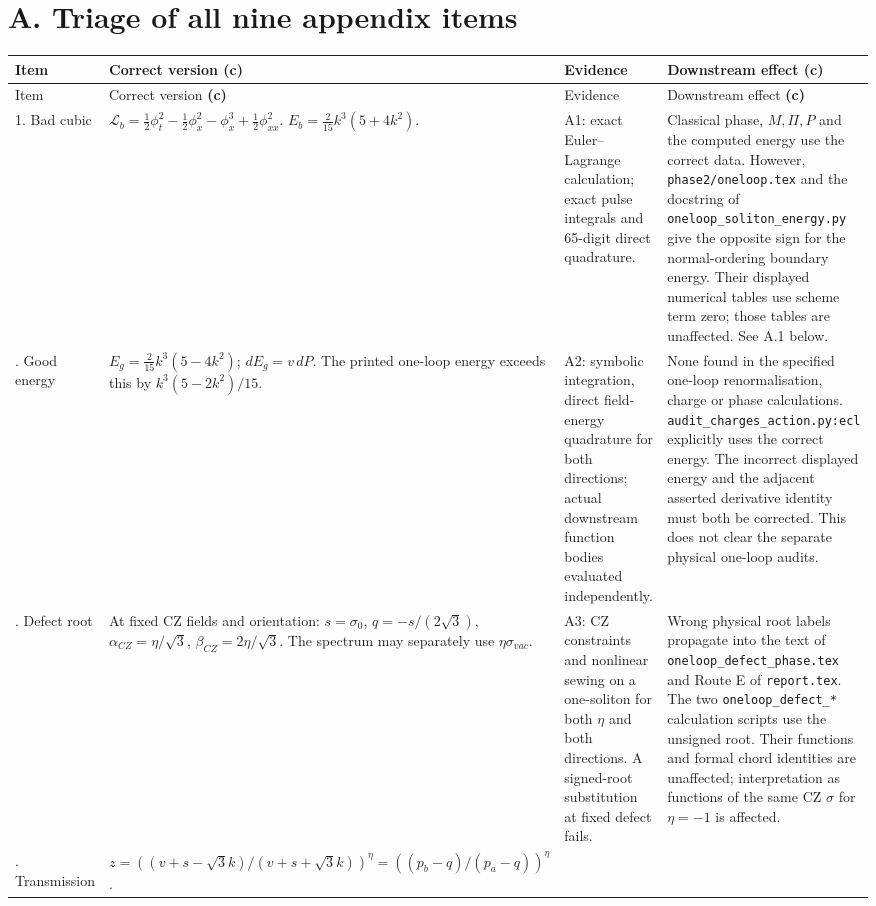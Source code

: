 \documentclass[11pt,a4paper]{article}
\newcommand{\C}{\textsf{\textbf{(c)}}}
\newcommand{\file}[1]{\nolinkurl{#1}}
\begin{document}
\section*{A. Triage of all nine appendix items}
\small
\begin{longtable}{@{}L{1.4cm}L{3.7cm}L{3.9cm}L{6.0cm}@{}}
\toprule Item & Correct version \C & Evidence & Downstream effect \C\\\midrule
\endfirsthead
\toprule Item & Correct version \C & Evidence & Downstream effect \C\\\midrule
{}. Bad cubic &
$\mathcal L_b=\frac12\phi_t^2-\frac12\phi_x^2-\phi_x^3+\frac12\phi_{xx}^2$.
$E_b=\frac2{15}k^3(5+4k^2)$. &
A1: exact Euler--Lagrange calculation; exact pulse integrals and 65-digit direct quadrature. &
Classical phase, $M,\Pi,P$ and the computed energy use the correct data.
However, \file{phase2/oneloop.tex} and the docstring of
\file{oneloop_soliton_energy.py} give the opposite sign for the normal-ordering
boundary energy. Their displayed numerical tables use scheme term zero;
those tables are unaffected. See A.1 below.\\. Good energy &
$E_g=\frac2{15}k^3(5-4k^2)$; $dE_g=v\,dP$.
The printed one-loop energy exceeds this by $k^3(5-2k^2)/15$. &
A2: symbolic integration, direct field-energy quadrature for both directions;
actual downstream function bodies evaluated independently. &
None found in the specified one-loop renormalisation, charge or phase
calculations. \file{audit_charges_action.py:ecl} explicitly uses the correct
energy. The incorrect displayed energy and the adjacent asserted derivative
identity must both be corrected. This does not clear the separate physical
one-loop audits.\\. Defect root &
At fixed CZ fields and orientation: $s=\sigma_0$, $q=-s/(2\sqrt3)$,
$\alpha_{CZ}=\eta/\sqrt3$, $\beta_{CZ}=2\eta/\sqrt3$.
The spectrum may separately use $\eta\sigma_{vac}$. &
A3: CZ constraints and nonlinear sewing on a one-soliton for both $\eta$ and
both directions. A signed-root substitution at fixed defect fails. &
Wrong physical root labels propagate into the text of
\file{oneloop_defect_phase.tex} and Route E of \file{report.tex}.
The two \file{oneloop_defect_*} calculation scripts use the unsigned root.
Their functions and formal chord identities are unaffected; interpretation
as functions of the same CZ $\sigma$ for $\eta=-1$ is affected.\\. Transmission &
$z=((v+s-\sqrt3 k)/(v+s+\sqrt3 k))^\eta
=((p_b-q)/(p_a-q))^\eta$.

\end{longtable}
\end{document}
